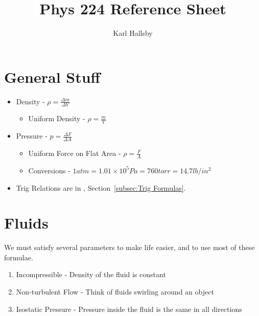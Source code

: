 \documentclass[10pt,letterpaper,final,twoside,notitlepage]{article}
\author{Karl Hallsby}
\title{Phys 224 Reference Sheet}
\numberwithin{equation}{section} %
\begin{document}
\section{General Stuff} \label{sec:General}
	\begin{itemize}[noitemsep]
		\item Density - $\rho = \frac{\Delta m}{\Delta V}$
			\begin{itemize}
				\item Uniform Density - $\rho = \frac{m}{V}$
			\end{itemize}
		
		\item Pressure - $p = \frac{\Delta F}{\Delta A}$
			\begin{itemize}
				\item Uniform Force on Flat Area - $\rho = \frac{F}{A}$
				\item Conversions - $1 atm = 1.01 \times 10^5 Pa = 760 torr = 14.7 lb/in^2$
			\end{itemize}
		\item Trig Relations are in , Section~\ref{subsec:Trig Formulas}.
	\end{itemize}

\section{Fluids} \label{sec:Fluids}
We must satisfy several parameters to make life easier, and to use most of these formulae.
	\begin{enumerate}[noitemsep]
		\item Incompressible - Density of the fluid is constant
		\item Non-turbulent Flow - Think of fluids swirling around an object
		\item Isostatic Pressure - Pressure inside the fluid is the same in all directions
	\end{enumerate}
\end{document}

